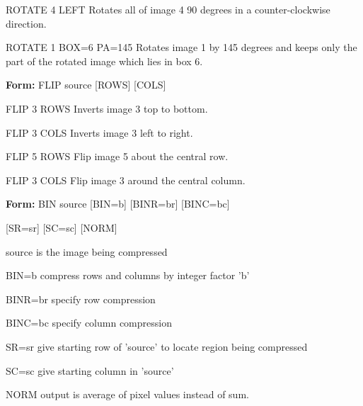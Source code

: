 {\newpage\clearpage
{}%
\begin{example}
  \item[ROTATE 4 LEFT\hfill]{Rotates all of image 4 90 degrees
       in a counter-clockwise direction.}
  \item[ROTATE 1 BOX=6 PA=145\hfill]{Rotates image 1 by 145 degrees and
       keeps only the part of the rotated image which lies in box 6.}
\end{example}%
\lthtmlfigureZ
\lthtmlcheckvsize\clearpage}

{\newpage\clearpage
{}%
\begin{command}
  \item[\textbf{Form: }FLIP source {[ROWS]} {[COLS]}\hfill]{}
\end{command}%
\lthtmlfigureZ
\lthtmlcheckvsize\clearpage}

{\newpage\clearpage
{}%
\begin{example}
  \item[FLIP 3 ROWS\hfill]{Inverts image 3 top to bottom.}
  \item[FLIP 3 COLS\hfill]{Inverts image 3 left to right.}
\end{example}%
\lthtmlfigureZ
\lthtmlcheckvsize\clearpage}

{\newpage\clearpage
{}%
\begin{example}
  \item[FLIP 5 ROWS\hfill]{Flip image 5 about the central row.}
  \item[FLIP 3 COLS\hfill]{Flip image 3 around the central column.}
\end{example}%
\lthtmlfigureZ
\lthtmlcheckvsize\clearpage}

{\newpage\clearpage
{}%
\begin{command}
  \item[\textbf{Form: }BIN source {[BIN=b]} {[BINR=br]} {[BINC=bc]} \hfill]{}
  \item{{[SR=sr]} {[SC=sc]} {[NORM]}}
  \item[source]{is the image being compressed}
  \item[BIN=b]{compress rows and columns by integer factor 'b'}
  \item[BINR=br]{specify row compression}
  \item[BINC=bc]{specify column compression}
  \item[SR=sr]{give starting row of 'source' to locate region
       being compressed}
  \item[SC=sc]{give starting column in 'source'}
  \item[NORM]{output is average of pixel values instead of sum.}
\end{command}%
\lthtmlfigureZ
\lthtmlcheckvsize\clearpage}

